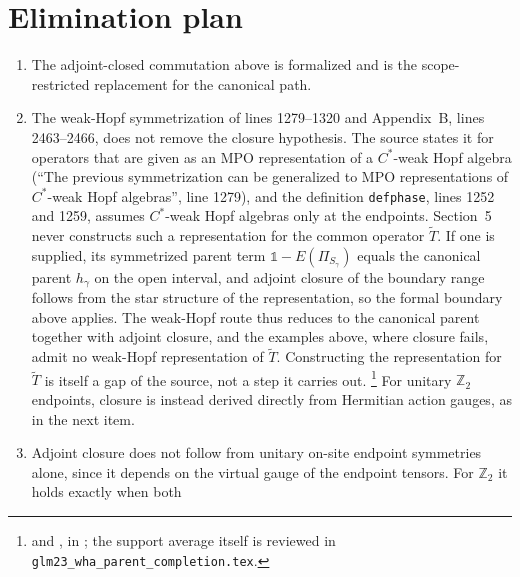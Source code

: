 \documentclass{article}
\begin{document}
\section{Elimination plan}
\begin{enumerate}
    \item The adjoint-closed commutation above is formalized and is the
          scope-restricted replacement for the canonical path.
    \item The weak-Hopf symmetrization of lines 1279--1320 and
          Appendix~B, lines 2463--2466, does not remove the closure
          hypothesis. The source states it for operators that are given
          as an MPO representation of a $C^*$-weak Hopf algebra
          (``The previous symmetrization can be generalized to MPO
          representations of ${C}^*$-weak Hopf algebras'', line 1279), and
          the definition \texttt{defphase}, lines 1252 and 1259, assumes
          $C^*$-weak Hopf algebras only at the endpoints. Section~5 never
          constructs such a representation for the common operator
          $\widetilde T$. If one is supplied, its symmetrized parent term
          $\mathbb 1-E(\Pi_{S_\gamma})$ equals the canonical parent
          $h_\gamma$ on the open interval, and adjoint closure of the
          boundary range follows from the star structure of the
          representation, so the formal boundary above applies. The
          weak-Hopf route thus reduces to the canonical parent together
          with adjoint closure, and the examples above, where closure
          fails, admit no weak-Hopf representation of $\widetilde T$.
          Constructing the representation for $\widetilde T$ is itself a
          gap of the source, not a step it carries out.%
          \footnote{
              and
              ,
              in ;
              the support average itself is reviewed in
              \texttt{glm23\_wha\_parent\_completion.tex}.}
          For unitary $\mathbb Z_2$ endpoints, closure is instead derived
          directly from Hermitian action gauges, as in the next item.
    \item Adjoint closure does not follow from unitary on-site endpoint
          symmetries alone, since it depends on the virtual gauge of the
          endpoint tensors. For $\mathbb Z_2$ it holds exactly when both

\end{enumerate}
\end{document}
